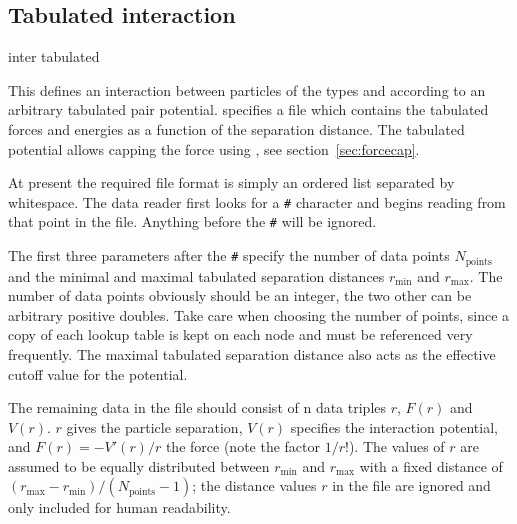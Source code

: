 \subsection{Tabulated interaction}
\label{sec:tabnonbonded}

\begin{essyntax}
  inter   tabulated %
  \begin{features}
  \end{features}
\end{essyntax}

This defines an interaction between particles of the types  and
 according to an arbitrary tabulated pair potential. 
specifies a file which contains the tabulated forces and energies as a function
of the separation distance. The tabulated potential allows capping the force
using , see section~\ref{sec:forcecap}.

At present the required file format is simply an ordered list separated by
whitespace. The data reader first looks for a {\tt \#} character and begins
reading from that point in the file. Anything before the {\tt \#} will be
ignored.

The first three parameters after the {\tt \#} specify the number of data points
$N_\mathrm{points}$ and the minimal and maximal tabulated separation distances
$r_\mathrm{min}$ and $r_\mathrm{max}$. The number of data points obviously should
be an integer, the two other can be arbitrary positive doubles. Take care when
choosing the number of points, since a copy of each lookup table is kept on each
node and must be referenced very frequently. The maximal tabulated separation
distance also acts as the effective cutoff value for the potential.

The remaining data in the file should consist of n data triples $r$, $F(r)$ and
$V(r)$. $r$ gives the particle separation, $V(r)$ specifies the interaction
potential, and $F(r)= -V'(r)/r$ the force (note the factor $1/r$!). The values
of $r$ are assumed to be equally distributed between $r_\mathrm{min}$ and
$r_\mathrm{max}$ with a fixed distance of
$(r_\mathrm{max}-r_\mathrm{min})/(N_\mathrm{points}-1)$; the distance values $r$ in
the file are ignored and only included for human readability.

